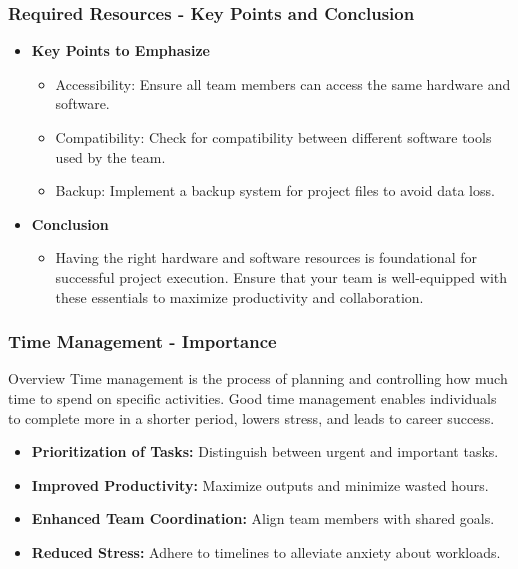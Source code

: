 \documentclass{beamer}
\begin{document}
\begin{frame}[fragile]
    \frametitle{Required Resources - Key Points and Conclusion}
    \begin{itemize}
        \item \textbf{Key Points to Emphasize}
        \begin{itemize}
            \item Accessibility: Ensure all team members can access the same hardware and software.
            \item Compatibility: Check for compatibility between different software tools used by the team.
            \item Backup: Implement a backup system for project files to avoid data loss.
        \end{itemize}
        
        \item \textbf{Conclusion}
        \begin{itemize}
            \item Having the right hardware and software resources is foundational for successful project execution. Ensure that your team is well-equipped with these essentials to maximize productivity and collaboration.
        \end{itemize}
    \end{itemize}
\end{frame}

\begin{frame}[fragile]
    \frametitle{Time Management - Importance}
    \begin{block}{Overview}
        Time management is the process of planning and controlling how much time to spend on specific activities. Good time management enables individuals to complete more in a shorter period, lowers stress, and leads to career success.
    \end{block}
    
    \begin{itemize}
        \item \textbf{Prioritization of Tasks:} Distinguish between urgent and important tasks.
        \item \textbf{Improved Productivity:} Maximize outputs and minimize wasted hours.
        \item \textbf{Enhanced Team Coordination:} Align team members with shared goals.
        \item \textbf{Reduced Stress:} Adhere to timelines to alleviate anxiety about workloads.
    \end{itemize}
\end{frame}
\end{document}
